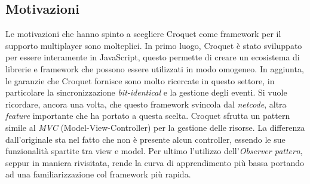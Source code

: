 \subsection{Motivazioni}\label{subsec:Croquet_motivazioni}
Le motivazioni che hanno spinto a scegliere Croquet come framework per il supporto multiplayer sono molteplici. In primo luogo, Croquet è stato sviluppato per essere interamente
in JavaScript, questo permette di creare un ecosistema di librerie e framework che possono essere utilizzati in modo omogeneo. In aggiunta, le garanzie che Croquet fornisce sono
molto ricercate in questo settore, in particolare la sincronizzazione \textit{bit-identical} e la gestione degli eventi. Si vuole ricordare, ancora una volta, che
questo framework svincola dal \textit{netcode}, altra \textit{feature} importante che ha portato a questa scelta. Croquet sfrutta un pattern simile al \textit{MVC} (Model-View-Controller) per la gestione delle risorse. La differenza dall'originale sta nel fatto che non è presente alcun controller, essendo le sue funzionalità spartite tra view e model. Per ultimo l'utilizzo dell'\textit{Observer pattern}, seppur in maniera rivisitata, rende la curva di apprendimento più bassa portando ad una familiarizzazione col framework più rapida.\\